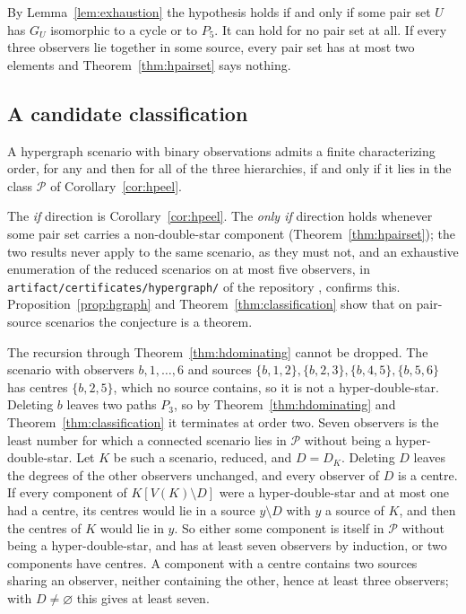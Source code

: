 By Lemma~\ref{lem:exhaustion} the hypothesis holds if and only if some pair set $U$ has $G_U$ isomorphic to a cycle or to $P_5$. It can hold for no pair set at all. If every three observers lie together in some source, every pair set has at most two elements and Theorem~\ref{thm:hpairset} says nothing.

\subsection{A candidate classification}

\begin{conjecture}\label{conj:hypergraph}
A hypergraph scenario with binary observations admits a finite characterizing order, for any and then for all of the three hierarchies, if and only if it lies in the class $\mathcal P$ of Corollary~\ref{cor:hpeel}.
\end{conjecture}

The \emph{if} direction is Corollary~\ref{cor:hpeel}. The \emph{only if} direction holds whenever some pair set carries a non-double-star component (Theorem~\ref{thm:hpairset}); the two results never apply to the same scenario, as they must not, and an exhaustive enumeration of the reduced scenarios on at most five observers, in \texttt{artifact/certificates/hypergraph/} of the repository \repo, confirms this. Proposition~\ref{prop:hgraph} and Theorem~\ref{thm:classification} show that on pair-source scenarios the conjecture is a theorem.

The recursion through Theorem~\ref{thm:hdominating} cannot be dropped. The scenario with observers $b,1,\dots,6$ and sources $\{b,1,2\},\{b,2,3\},\{b,4,5\},\{b,5,6\}$ has centres $\{b,2,5\}$, which no source contains, so it is not a hyper-double-star. Deleting $b$ leaves two paths $P_3$, so by Theorem~\ref{thm:hdominating} and Theorem~\ref{thm:classification} it terminates at order two. Seven observers is the least number for which a connected scenario lies in $\mathcal P$ without being a hyper-double-star. Let $K$ be such a scenario, reduced, and $D=D_K$. Deleting $D$ leaves the degrees of the other observers unchanged, and every observer of $D$ is a centre. If every component of $K[V(K)\setminus D]$ were a hyper-double-star and at most one had a centre, its centres would lie in a source $y\setminus D$ with $y$ a source of $K$, and then the centres of $K$ would lie in $y$. So either some component is itself in $\mathcal P$ without being a hyper-double-star, and has at least seven observers by induction, or two components have centres. A component with a centre contains two sources sharing an observer, neither containing the other, hence at least three observers; with $D\ne\varnothing$ this gives at least seven.

